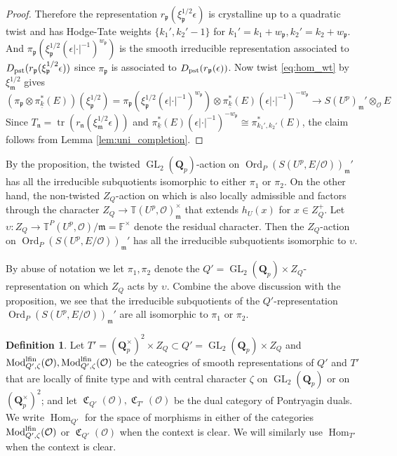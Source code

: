 \documentclass[leqno]{amsart}
\theoremstyle{definition}
\newtheorem{defn}[thm]{Definition}
\theoremstyle{remark}
\newcommand{\oo}{\mathcal{O}}
\newcommand{\fF}{\mathbb{F}} %
\newcommand{\Qp}{\mathbf{Q}_p}
\DeclareMathOperator{\Hom}{Hom}
\DeclareMathOperator{\GL}{GL}
\DeclareMathOperator{\mtr}{tr}
\newcommand{\pst}{\textnormal{pst}}
\newcommand{\fm}{\mathfrak{m}}
\newcommand{\fn}{\mathfrak{n}}
\newcommand{\fp}{\mathfrak{p}}
\DeclareMathOperator{\Mod}{\textnormal{Mod}}
\DeclareMathOperator{\fC}{\mathfrak{C}} %
\DeclareMathOperator{\Ord}{Ord} %
\newcommand{\lfin}{\textnormal{lfin}}
\newcommand{\wt}[1]{\underline{ #1 }}
\newcommand{\TT}{\mathbb{T}} %
\begin{document}
\begin{proof}
Therefore the representation
$r_{\fp}(\xi_{\fp}^{1/2}\epsilon)$
is crystalline up to a quadratic twist
and has Hodge-Tate weights  $\{k_1',k_2'-1\}$ 
for $k_1'=k_1+w_\fp, k_2'=k_2+w_\fp$.
And $\pi_\fp(\xi_\fp^{1/2}(\epsilon|\cdot|^{-1})^{w_\fp})$
is the smooth irreducible
representation associated to 
$D_{\pst}(r_{\fp}(\xi_\fp^{1/2}\epsilon))$
since $\pi_\fp$ is associated to 
$D_{\pst}(r_{\fp}(\epsilon))$.
Now twist \eqref{eq:hom_wt} by $\xi_\fm^{1/2}$ gives
\[
    (\pi_{\fp}\otimes \pi_{\wt{k}}^*(E))(\xi_\fp^{1/2})=
    \pi_\fp(\xi_\fp^{1/2}(\epsilon|\cdot|^{-1})^{w_\fp})
    \otimes \pi_{\wt{k}}^*(E)(\epsilon|\cdot|^{-1})^{-w_{\fp}} \to 
    S(U^p)_\fm'\otimes_{\oo}E
\]
Since  $T_\fn=\mtr(r_{\fn}(\xi_\fm^{1/2}\epsilon))$
and $\pi_{\wt{k}}^*(E)(\epsilon|\cdot|^{-1})^{-w_{\fp}}\cong 
\pi_{k_1',k_2'}^*(E)$,
the claim follows from Lemma \ref{lem:uni_completion}.
\end{proof}

By the proposition,
the twisted $\GL_2(\Qp)$-action 
on $\Ord_P(S(U^p,E/\oo))_\fm'$
has all the irreducible subquotients
isomorphic to either $\pi_1$ or $\pi_2$.
On the other hand,
the non-twisted $Z_Q$-action on which
is also locally admissible and
factors through the character
$Z_Q\to \TT(U^p,\oo)_{\fm}^{\times}$
that extends $h_U(x)$ for $x\in Z_Q^+$.
Let $\upsilon\colon Z_Q\to \TT^P(U^p,\oo)/\fm=\fF^\times$
denote the residual character.
Then the $Z_Q$-action 
on $\Ord_P(S(U^p,E/\oo))_{\fm}'$
has all the irreducible subquotients
isomorphic to $\upsilon$.





By abuse of notation
we let $\pi_1,\pi_2$ denote
the $Q'=\GL_2(\Qp)\times Z_Q$-representation
on which $Z_Q$ acts by $\upsilon$.
Combine the above discussion with the 
proposition,
we see that the irreducible subquotients
of the $Q'$-representation
$\Ord_P(S(U^p,E/\oo))_{\fm}'$
are all isomorphic to $\pi_1$ or $\pi_2$.


\begin{defn}

Let $T'=(\Qp^\times)^2\times Z_Q\subset Q'=\GL_2(\Qp)\times Z_Q$
and 
$\Mod^{\lfin}_{Q',\zeta}(\oo),\Mod^{\lfin}_{Q',\zeta}(\oo)$
be the cateogries of smooth representations of 
$Q'$ and $T'$ that are locally of finite type
and with central character $\zeta$
on $\GL_2(\Qp)$ or on $(\Qp^\times)^2$;
and let $\fC_{Q'}(\oo), \fC_{T'}(\oo)$
be the dual category of Pontryagin duals.
We write $\Hom_{Q'}$ for the space of morphisms
in either of the categories 
$\Mod^{\lfin}_{Q',\zeta}(\oo)$ or $\fC_{Q'}(\oo)$
when the context is clear.
We will similarly use $\Hom_{T'}$
when the context is clear.
\end{defn}
\end{document}
